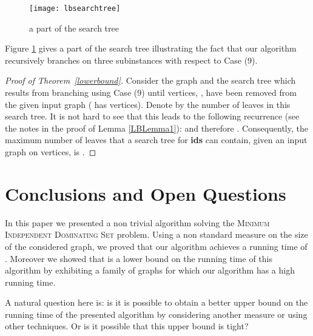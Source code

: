 \documentclass[a4paper,10pt]{article}
\theoremstyle{plain}
\theoremstyle{definition}
\theoremstyle{remark}
\begin{document}
\begin{figure}[htb]
\centering
      \texttt{[image: lbsearchtree]}
      \caption{\label{lbsearchtree}a part of the search tree}
\end{figure}


Figure \ref{lbsearchtree} gives a part of the search tree illustrating the fact that
our algorithm recursively branches on three subinstances with respect to Case (9).

\begin{proof}[Proof of Theorem~\ref{lowerbound}]
Consider the graph  and the search tree which results from branching using
Case (9) until  vertices, , have been removed from the
given input graph  ( has  vertices).
Denote by  the number of leaves in this search tree.
It is not hard to see that this leads to the following recurrence
(see the notes in the proof of Lemma \ref{LBLemma1}):
 and therefore .
Consequently, the maximum number of leaves that
a search tree for {\bf ids} can contain, given an input graph on 
vertices, is .
\end{proof}














\section{Conclusions and Open Questions}


In this paper we presented a non trivial algorithm solving
the \textsc{Minimum Independent Dominating Set} problem. Using a non standard measure on
the size of the considered graph, we proved that our algorithm achieves a running
time of . Moreover we showed that  is a lower bound on
the running time of this algorithm by exhibiting a family of graphs for which
our algorithm has a high running time.

A natural question here is: is it is possible to obtain a better upper bound on
the running time of the presented algorithm by considering another measure or
using other techniques. Or is it possible that this upper bound is tight?
\end{document}
